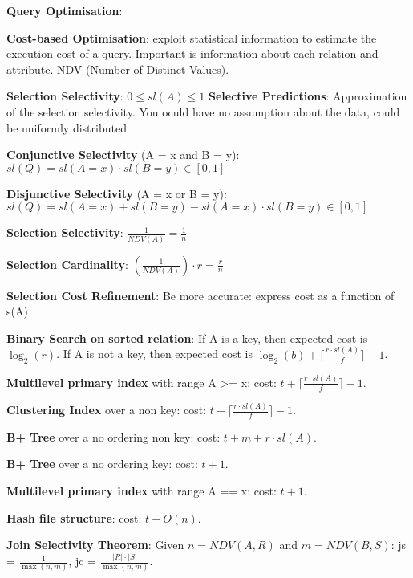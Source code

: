 \documentclass{article}
\begin{document}
\noindent \textbf{Query Optimisation}:

\noindent \textbf{Cost-based Optimisation}: exploit statistical information to estimate the execution cost of a query.
Important is information about each relation and attribute. NDV (Number of Distinct Values).

\noindent \textbf{Selection Selectivity}: $0 \leq sl(A) \leq 1$
\noindent \textbf{Selective Predictions}: Approximation of the selection selectivity. You oculd have no assumption about the data,
could be uniformly distributed

\noindent \textbf{Conjunctive Selectivity} (A = x and B = y): $sl(Q) = sl(A = x) \cdot sl(B = y) \in [0, 1]$

\noindent \textbf{Disjunctive Selectivity} (A = x or B = y): $sl(Q) = sl(A = x) + sl(B = y) - sl(A = x) \cdot sl(B = y) \in [0, 1]$

\noindent \textbf{Selection Selectivity}: $\frac{1}{NDV(A)} = \frac{1}{n}$

\noindent \textbf{Selection Cardinality}: $\left(\frac{1}{NDV(A)}\right) \cdot r = \frac{r}{n}$

\noindent \textbf{Selection Cost Refinement}: Be more accurate: express cost as a function of {s(A)}

\noindent \textbf{Binary Search on sorted relation}: If A is a key, then expected cost is $\log_2(r)$.
If A is not a key, then expected cost is $\log_2(b) + \lceil \frac{r \cdot sl(A)}{f} \rceil - 1$.

\noindent \textbf{Multilevel primary index} with range A >= x: cost: $t + \lceil \frac{r \cdot sl(A)}{f} \rceil - 1$.

\noindent \textbf{Clustering Index} over a non key: cost: $t + \lceil \frac{r \cdot sl(A)}{f} \rceil - 1$.

\noindent \textbf{B+ Tree} over a no ordering non key: cost: $t + m + r \cdot sl(A)$.

\noindent \textbf{B+ Tree} over a no ordering key: cost: $t + 1$.

\noindent \textbf{Multilevel primary index} with range A == x: cost: $t + 1$.

\noindent \textbf{Hash file structure}: cost: $t + O(n)$.

\noindent \textbf{Join Selectivity Theorem}: Given $n = NDV(A, R)$ and $m = NDV(B, S)$: js = $\frac{1}{\max(n, m)}$, jc = $\frac{|R| \cdot |S|}{\max(n, m)}$.
\end{document}
